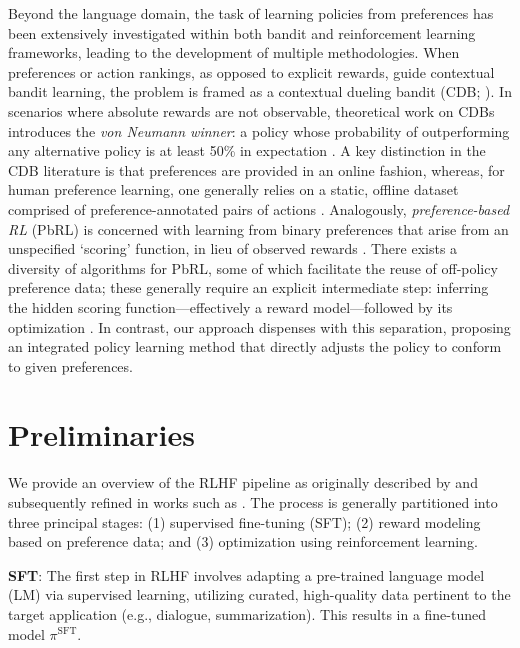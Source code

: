 Beyond the language domain, the task of learning policies from preferences has been extensively investigated within both bandit and reinforcement learning frameworks, leading to the development of multiple methodologies. When preferences or action rankings, as opposed to explicit rewards, guide contextual bandit learning, the problem is framed as a contextual dueling bandit (CDB; \cite{yue2012karmed,dudik2015contextual}). In scenarios where absolute rewards are not observable, theoretical work on CDBs introduces the \textit{von Neumann winner}: a policy whose probability of outperforming any alternative policy is at least 50\% in expectation \citep{dudik2015contextual}. A key distinction in the CDB literature is that preferences are provided in an online fashion, whereas, for human preference learning, one generally relies on a static, offline dataset comprised of preference-annotated pairs of actions \citep{yan2022human}. Analogously, \textit{preference-based RL} (PbRL) is concerned with learning from binary preferences that arise from an unspecified `scoring' function, in lieu of observed rewards \citep{BusaFekete2014,ruiz2023dueling}. There exists a diversity of algorithms for PbRL, some of which facilitate the reuse of off-policy preference data; these generally require an explicit intermediate step: inferring the hidden scoring function—effectively a reward model—followed by its optimization \citep{jain2013learning,BusaFekete2014,christiano2017deep,sadigh2017active,kupcsik2018learning}. In contrast, our approach dispenses with this separation, proposing an integrated policy learning method that directly adjusts the policy to conform to given preferences.

\section{Preliminaries}\label{section:prelims}

We provide an overview of the RLHF pipeline as originally described by \citeauthor{ziegler2020finetuning} and subsequently refined in works such as \citep{stiennon2022learning, bai2022training, ouyang2022training}. The process is generally partitioned into three principal stages: (1) supervised fine-tuning (SFT); (2) reward modeling based on preference data; and (3) optimization using reinforcement learning.

\textbf{SFT}: The first step in RLHF involves adapting a pre-trained language model (LM) via supervised learning, utilizing curated, high-quality data pertinent to the target application (e.g., dialogue, summarization). This results in a fine-tuned model $\pi^\text{SFT}$.

